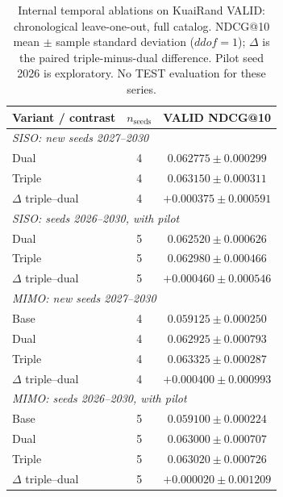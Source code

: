 \begin{table}[t]
\centering
\small
\caption{Internal temporal ablations on KuaiRand VALID: chronological leave-one-out, full catalog. NDCG@10 mean $\pm$ sample standard deviation ($ddof=1$); $\Delta$ is the paired triple-minus-dual difference. Pilot seed 2026 is exploratory. No TEST evaluation for these series.}
\label{tab:internal-time-valid}
\begin{tabular}{lcc}
\toprule
Variant / contrast & $n_{\mathrm{seeds}}$ & VALID NDCG@10 \\
\midrule
\multicolumn{3}{l}{\textit{SISO: new seeds 2027--2030}} \\
Dual & 4 & $0.062775 \pm 0.000299$ \\
Triple & 4 & $0.063150 \pm 0.000311$ \\
$\Delta$ triple--dual & 4 & $+0.000375 \pm 0.000591$ \\
\midrule
\multicolumn{3}{l}{\textit{SISO: seeds 2026--2030, with pilot}} \\
Dual & 5 & $0.062520 \pm 0.000626$ \\
Triple & 5 & $0.062980 \pm 0.000466$ \\
$\Delta$ triple--dual & 5 & $+0.000460 \pm 0.000546$ \\
\midrule
\multicolumn{3}{l}{\textit{MIMO: new seeds 2027--2030}} \\
Base & 4 & $0.059125 \pm 0.000250$ \\
Dual & 4 & $0.062925 \pm 0.000793$ \\
Triple & 4 & $0.063325 \pm 0.000287$ \\
$\Delta$ triple--dual & 4 & $+0.000400 \pm 0.000993$ \\
\midrule
\multicolumn{3}{l}{\textit{MIMO: seeds 2026--2030, with pilot}} \\
Base & 5 & $0.059100 \pm 0.000224$ \\
Dual & 5 & $0.063000 \pm 0.000707$ \\
Triple & 5 & $0.063020 \pm 0.000726$ \\
$\Delta$ triple--dual & 5 & $+0.000020 \pm 0.001209$ \\
\bottomrule
\end{tabular}
\end{table}
